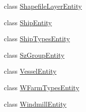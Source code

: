 \begin{DoxyCompactItemize}
class \mbox{\hyperlink{classobjecttree_1_1_shapefile_layer_entity}{Shapefile\+Layer\+Entity}}
\item 
class \mbox{\hyperlink{classobjecttree_1_1_ship_entity}{Ship\+Entity}}
\item 
class \mbox{\hyperlink{classobjecttree_1_1_ship_types_entity}{Ship\+Types\+Entity}}
\item 
class \mbox{\hyperlink{classobjecttree_1_1_sz_group_entity}{Sz\+Group\+Entity}}
\item 
class \mbox{\hyperlink{classobjecttree_1_1_vessel_entity}{Vessel\+Entity}}
\item 
class \mbox{\hyperlink{classobjecttree_1_1_w_farm_types_entity}{W\+Farm\+Types\+Entity}}
\item 
class \mbox{\hyperlink{classobjecttree_1_1_windmill_entity}{Windmill\+Entity}}
\end{DoxyCompactItemize}
